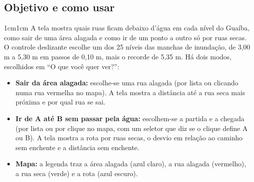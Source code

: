 \documentclass[12pt,a4paper]{article}
\newcommand{\paragrafo}[1]{%
    \begin{adjustwidth}{1cm}{1cm}
        \indent\indent #1
    \end{adjustwidth}
}
\begin{document}
    \subsection{Objetivo e como usar}
        \paragrafo{A tela mostra quais ruas ficam debaixo d'água em cada nível do Guaíba, como sair de uma área alagada e como ir de um ponto a outro só por ruas secas. O controle deslizante escolhe um dos 25 níveis das manchas de inundação, de 3,00 m a 5,30 m em passos de 0,10 m, mais o recorde de 5,35 m. Há dois modos, escolhidos em ``O que você quer ver?'':}
        \begin{itemize}
            \item \textbf{Sair da área alagada:} escolhe-se uma rua alagada (por lista ou clicando numa rua vermelha no mapa). A tela mostra a distância até a rua seca mais próxima e por qual rua se sai.
            \item \textbf{Ir de A até B sem passar pela água:} escolhem-se a partida e a chegada (por lista ou por clique no mapa, com um seletor que diz se o clique define A ou B). A tela mostra a rota por ruas secas, o desvio em relação ao caminho sem enchente e a distância sem enchente.
            \item \textbf{Mapa:} a legenda traz a área alagada (azul claro), a rua alagada (vermelho), a rua seca (verde) e a rota (azul escuro).
        \end{itemize}
\end{document}
